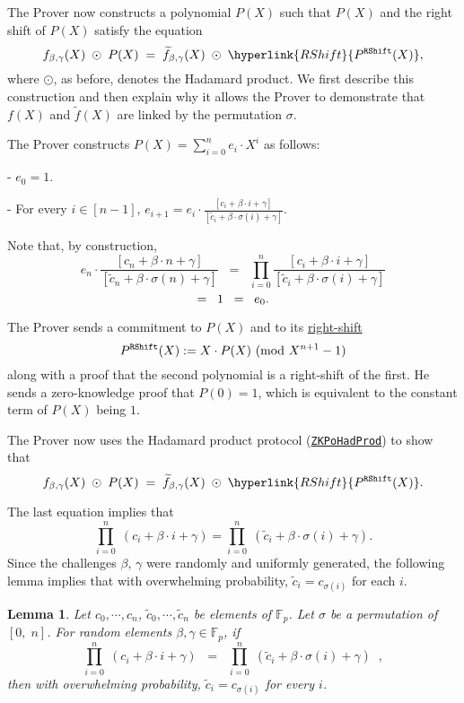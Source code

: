 \documentclass[11pt, lettersize, notitlepage, leqno, footskip=0.6cm]{article}
\newcommand{\bFp}{\mathbb{F}_p}
\newcommand{\wti}{\widetilde}
\newcommand{\be}{\beta}
\newcommand{\vs}{\vspace{-0.15cm}}
\newcommand{\noin}{\noindent}
\newcommand{\op}{overwhelming probability}
\newcommand{\Mod}[1]{\ (\mathrm{mod}\ #1)}
\newtheorem{Lem}[Thm]{Lemma}
\numberwithin{equation}{section}
\begin{document}
The Prover now constructs a polynomial $P(X)$ such that $P(X)$ and the right shift of $P(X)$ satisfy the equation \vspace{-2mm} $$f_{\be,\gamma}(X)\;\odot\; P(X) \;=\; \wti{f}_{\be,\gamma}(X) \;\odot\; \hyperlink{RShift}{P^{\tt{RShift}}(X)},   $$ where $\odot$, as before, denotes the Hadamard product. We first describe this construction and then explain why it allows the Prover to demonstrate that $f(X)$ and $\wti{f}(X)$ are linked by the permutation $\sigma$.

The Prover constructs $P(X) = \sum_{i=0}^{n} e_i\cdot X^i  $ as follows: \vspace{2mm}

\noin - $e_0 = 1$. \vspace{1mm}

\noin - For every $i\in [n-1]$, $e_{i+1} = e_{i}\cdot \frac{[{c_i+\be\cdot i +\gamma}]}{ [{\wti{c}_i+\be\cdot \sigma(i) +\gamma}]}$. \vspace{2mm}

\noin Note that, by construction, \vs $$e_n\cdot \frac{[{c_n+\be\cdot n +\gamma}]}{ [{\wti{c}_n+\be\cdot \sigma(n) +\gamma}]}\;\; = \;\;\prod\limits_{i=0}^n  \frac{[{c_i+\be\cdot i +\gamma}]}{ [{\wti{c}_i+\be\cdot \sigma(i) +\gamma}]} $$ \vspace{-3mm} $$ = \;\;1 \;\;=\;\; e_0. \vs  $$

\noin The Prover sends a commitment to $P(X)$ and to its \hyperlink{RShift}{right-shift}  $$P^{\tt{RShift}}(X):= X\cdot P(X)\Mod{X^{n+1}-1} $$ along with a proof that the second polynomial is a right-shift of the first. He sends a zero-knowledge proof that $P(0) = 1$, which is equivalent to the constant term of $P(X)$ being $1$.

The Prover now uses the Hadamard product protocol (\hyperlink{HadProd}{\tt{ZKPoHadProd}}) to show that \vs $$f_{\be,\gamma}(X)\;\odot\; P(X) \;=\; \wti{f}_{\be,\gamma}(X) \;\odot\; \hyperlink{RShift}{P^{\tt{RShift}}(X)}.   $$

\noin The last equation implies that 
\vs $$ \prod\limits_{i=0}^n\; (c_i+\be\cdot i + \gamma) = \prod\limits_{i=0}^n\; (\wti{c}_i+\be\cdot \sigma(i) + \gamma). $$ Since the challenges $\be$, $\gamma$ were randomly and uniformly generated, the following lemma implies that with \op, $\wti{c}_i = c_{\sigma(i)}$ for each $i$.

\vspace{2mm}

\begin{Lem} \label{Bayer} Let $c_0,\cdots,c_n$, $\wti{c}_0,\cdots,\wti{c}_n$ be elements of $\bFp$. Let $\sigma$ be a permutation of $[0,\; n]$. For random elements $\be,\gamma\in \bFp$, if \vs $$ \prod\limits_{i=0}^n\; (c_i+\be\cdot i + \gamma)\;\; =\;\; \prod\limits_{i=0}^n\; (\wti{c}_i+\be\cdot \sigma(i) + \gamma)\;\;, $$ then with \op, $\wti{c}_i = c_{\sigma(i)}$ for every $i$. \end{Lem}
\end{document}
